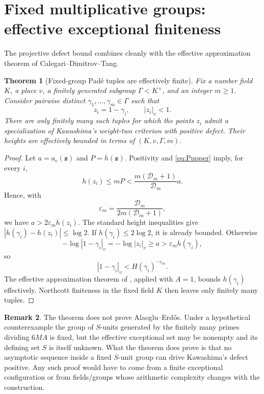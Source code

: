 \documentclass[11pt]{article}
\newtheorem{theorem}{Theorem}[section]
\theoremstyle{definition}
\newtheorem{remark}[theorem]{Remark}
\newcommand{\D}{\mathcal D}
\begin{document}
\section{Fixed multiplicative groups: effective exceptional finiteness}

The projective defect bound combines cleanly with the effective approximation theorem of
Calegari--Dimitrov--Tang.

\begin{theorem}[Fixed-group Pad\'e tuples are effectively finite]\label{thm:fixed-group}
Fix a number field $K$, a place $v$, a finitely generated subgroup
$\Gamma<K^\times$, and an integer $m\ge1$.  Consider pairwise distinct
$\gamma_1,\ldots,\gamma_m\in\Gamma$ such that
\[
  z_i=1-\gamma_i,\qquad |z_i|_v<1.
\]
There are only finitely many such tuples for which the points $z_i$ admit a specialization of
Kawashima's weight-two criterion with positive defect.  Their heights are effectively bounded
in terms of $(K,v,\Gamma,m)$.
\end{theorem}

\begin{proof}
Let $a=a_v(\mathbf z)$ and $P=\overline h(\mathbf z)$.  Positivity and
\eqref{eq:Pupper} imply, for every $i$,
\[
 h(z_i)\le mP<\frac{m(\D_m+1)}{\D_m}a.
\]
Hence, with
\[
 \varepsilon_m=\frac{\D_m}{2m(\D_m+1)},
\]
we have $a>2\varepsilon_m h(z_i)$.  The standard height inequalities give
$|h(\gamma_i)-h(z_i)|\le\log2$.  If $h(\gamma_i)\le2\log2$, it is already bounded.
Otherwise
\[
 -\log|1-\gamma_i|_v=-\log|z_i|_v\ge a
   >\varepsilon_m h(\gamma_i),
\]
so
\[
 |1-\gamma_i|_v<H(\gamma_i)^{-\varepsilon_m}.
\]
The effective approximation theorem of \cite{CDTHolonomy}, applied with $A=1$, bounds
$h(\gamma_i)$ effectively.  Northcott finiteness in the fixed field $K$ then leaves only
finitely many tuples.
\end{proof}

\begin{remark}
The theorem does not prove Alaoglu--Erd\H{o}s.  Under a hypothetical counterexample the group
of $S$-units generated by the finitely many primes dividing $6MA$ is fixed, but the effective
exceptional set may be nonempty and its defining set $S$ is itself unknown.  What the theorem
does prove is that no asymptotic sequence inside a fixed $S$-unit group can drive Kawashima's
defect positive.  Any such proof would have to come from a finite exceptional configuration or
from fields/groups whose arithmetic complexity changes with the construction.
\end{remark}
\end{document}
